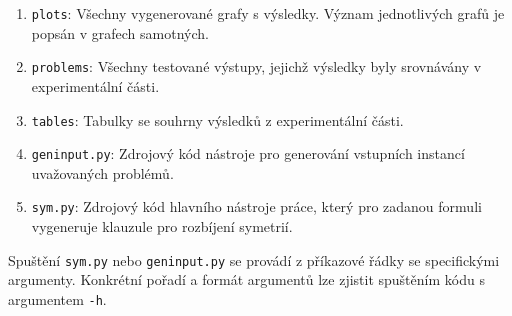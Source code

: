 \documentclass[12pt,a4paper]{report}
\begin{document}
\begin{enumerate}
        \item \texttt{plots}: Všechny vygenerované grafy s výsledky. Význam jednotlivých grafů je popsán v grafech samotných.
        \item \texttt{problems}: Všechny testované výstupy, jejichž výsledky byly srovnávány v experimentální části.
        \item \texttt{tables}: Tabulky se souhrny výsledků z experimentální části.
	\item \texttt{geninput.py}: Zdrojový kód nástroje pro generování vstupních instancí uvažovaných problémů.
	\item \texttt{sym.py}: Zdrojový kód hlavního nástroje práce, který pro zadanou formuli vygeneruje klauzule pro rozbíjení symetrií.
    \end{enumerate} 

Spuštění \texttt{sym.py} nebo \texttt{geninput.py} se provádí z příkazové řádky se specifickými argumenty. Konkrétní pořadí a formát argumentů lze zjistit spuštěním kódu s argumentem \texttt{-h}.
\end{document}
